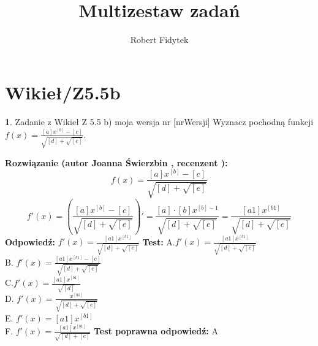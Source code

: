 \documentclass[12pt, a4paper]{article}
\title{Multizestaw zadań}
\author{Robert Fidytek}
\date{}
\theoremstyle{definition} %
\newtheorem{zad}{}
\newcommand{\kategoria}[1]{\section{#1}} %
\newcommand{\zadStart}[1]{\begin{zad}#1\newline} %
\newcommand{\zadStop}{\end{zad}}   %
\newcommand{\rozwStart}[2]{\noindent \textbf{Rozwiązanie (autor #1 , recenzent #2): }\newline} %
\newcommand{\rozwStop}{\newline}                                            %
\newcommand{\odpStart}{\noindent \textbf{Odpowiedź:}\newline}    %
\newcommand{\odpStop}{\newline}                                             %
\newcommand{\testStart}{\noindent \textbf{Test:}\newline} %
\newcommand{\testStop}{\newline} %
\newcommand{\kluczStart}{\noindent \textbf{Test poprawna odpowiedź:}\newline} %
\newcommand{\kluczStop}{\newline} %
\begin{document}
\maketitle


\kategoria{Wikieł/Z5.5b}
\zadStart{Zadanie z Wikieł Z 5.5 b) moja wersja nr [nrWersji]}
Wyznacz pochodną funkcji \\ $f(x)=\frac{[a]x^{[b]}-[c]}{\sqrt{[d]+\sqrt{[e]}}}$.
\zadStop
\rozwStart{Joanna Świerzbin}{}
$$f(x)=\frac{[a]x^{[b]}-[c]}{\sqrt{[d]+\sqrt{[e]}}}$$
$$f'(x)=\left(\frac{[a]x^{[b]}-[c]}{\sqrt{[d]+\sqrt{[e]}}} \right)'
= \frac{[a]\cdot [b]x^{[b]-1}}{\sqrt{[d]+\sqrt{[e]}}} 
= \frac{[a1]x^{[b1]}}{\sqrt{[d]+\sqrt{[e]}}} $$
\rozwStop
\odpStart
$ f'(x)= \frac{[a1]x^{[b1]}}{\sqrt{[d]+\sqrt{[e]}}} $
\odpStop
\testStart
A.$ f'(x)= \frac{[a1]x^{[b1]}}{\sqrt{[d]+\sqrt{[e]}}} $\\
B. $ f'(x)= \frac{[a1]x^{[b1]}-[c]}{\sqrt{[d]+\sqrt{[e]}}} $ \\
C.$ f'(x)= \frac{[a1]x^{[b1]}}{\sqrt{[d]}} $ \\
D. $ f'(x)= \frac{x^{[b1]}}{\sqrt{[d]+\sqrt{[e]}}} $\\
E. $ f'(x)= [a1]x^{[b1]} $\\
F. $ f'(x)= \frac{[a1]x^{[b1]}}{\sqrt{[d]+{[e]}}} $
\testStop
\kluczStart
A
\kluczStop
\end{document}
